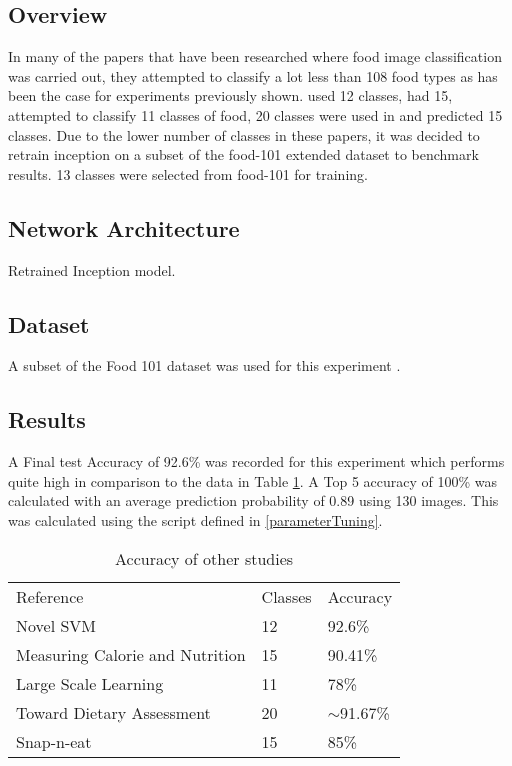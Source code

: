 \subsection*{Overview}
In many of the papers that have been researched where food image classification was carried out, they attempted to classify a lot less than 108 food types as has been the case for experiments previously shown.
\textcite{novelSVM} used 12 classes, \textcite{pouladzadeh2014measuring} had 15, \textcite{LSL_2015} attempted to classify 11 classes of food, 20 classes were used in \textcite{chen2010toward} and \textcite{snap} predicted 15 classes.
Due to the lower number of classes in these papers, it was decided to retrain inception on a subset of the food-101 extended dataset to benchmark results.
13 classes were selected from food-101 for training.

\subsection*{Network Architecture}
Retrained Inception model.

\subsection*{Dataset}
A subset of the Food 101 dataset was used for this experiment \textcite{food101}.

\subsection*{Results}
A Final test Accuracy of 92.6\% was recorded for this experiment which performs quite high in comparison to the data in Table \ref{classes_accuracy}.
A Top 5 accuracy of 100\% was calculated with an average prediction probability of 0.89 using 130 images.
This was calculated using the script defined in \ref{parameterTuning}.

\begin{table}[]
\centering
\caption{Accuracy of other studies}
\label{classes_accuracy}
\begin{tabular}{lll}
Reference                       & Classes & Accuracy      \\
Novel SVM                       & 12      & 92.6\%        \\
Measuring Calorie and Nutrition & 15      & 90.41\%       \\
Large Scale Learning            & 11      & 78\%          \\
Toward Dietary Assessment       & 20      & $\sim$91.67\% \\
Snap-n-eat                      & 15      & 85\%         
\end{tabular}
\end{table}

